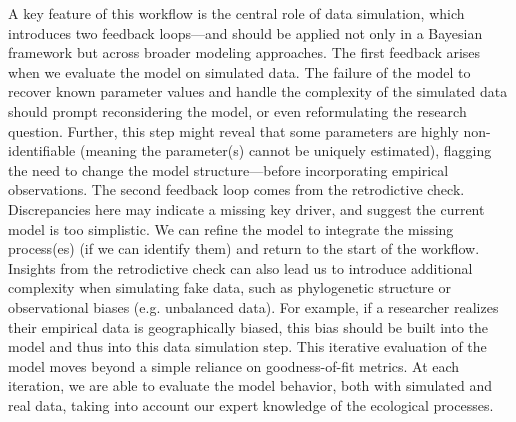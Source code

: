 \documentclass[11pt]{article}
\newcommand{\llabel}[1]{\hypertarget{lintarget:#1}{}\linelabel{lin:#1}}
\begin{document}
A key feature of this workflow is the central role of data simulation, which introduces two feedback loops---\llabel{broadcontext}and should be applied not only in a Bayesian framework but across broader modeling approaches.
The first feedback arises when we evaluate the model on simulated data.
The failure of the model to recover known parameter values and handle the complexity of the simulated data should prompt reconsidering the model, or even reformulating the research question.
Further, this step might reveal that some parameters are highly non-identifiable (meaning the parameter(s) cannot be uniquely estimated),
flagging the need to change the model structure---before incorporating empirical observations. 
The second feedback loop comes from the retrodictive check. 
Discrepancies here may indicate a missing key driver, and suggest the current model is too simplistic. We can refine the model to integrate the missing process(es) (if we can identify them) and return to the start of the workflow. Insights from the retrodictive check can also lead us to introduce additional complexity when simulating fake data, such as phylogenetic structure or observational biases (e.g. unbalanced data). For example, if a researcher realizes their empirical data is geographically biased, this bias should be built into the model and thus into this data simulation step. This iterative evaluation of the model moves beyond a simple reliance on goodness-of-fit metrics. At each iteration, we are able to evaluate the model behavior, both with simulated and real data, taking into account our expert knowledge of the ecological processes. 
\end{document}
